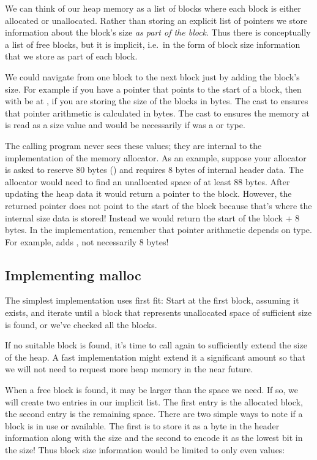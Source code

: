We can think of our heap memory as a list of blocks where each block is either allocated or unallocated. Rather than storing an explicit list of pointers we store information about the block's size \emph{as part of the block}. Thus there is conceptually a list of free blocks, but it is implicit, i.e.~in the form of block size information that we store as part of each block.

We could navigate from one block to the next block just by adding the block's size. For example if you have a pointer  that points to the start of a block, then  with be at , if you are storing the size of the blocks in bytes. The cast to  ensures that pointer arithmetic is calculated in bytes. The cast to  ensures the memory at  is read as a size value and would be necessarily if  was a  or  type.

The calling program never sees these values; they are internal to the implementation of the memory allocator. As an example, suppose your allocator is asked to reserve 80 bytes () and requires 8 bytes of internal header data. The allocator would need to find an unallocated space of at least 88 bytes. After updating the heap data it would return a pointer to the block. However, the returned pointer does not point to the start of the block because that's where the internal size data is stored! Instead we would return the start of the block + 8 bytes. In the implementation, remember that pointer arithmetic depends on type. For example,  adds , not necessarily 8 bytes!

\subsection{Implementing malloc}

The simplest implementation uses first fit: Start at the first block, assuming it exists, and iterate until a block that represents unallocated space of sufficient size is found, or we've checked all the blocks.

If no suitable block is found, it's time to call  again to sufficiently extend the size of the heap. A fast implementation might extend it a significant amount so that we will not need to request more heap memory in the near future.

When a free block is found, it may be larger than the space we need. If so, we will create two entries in our implicit list. The first entry is the allocated block, the second entry is the remaining space. There are two simple ways to note if a block is in use or available. The first is to store it as a byte in the header information along with the size and the second to encode it as the lowest bit in the size! Thus block size information would be limited to only even values:

